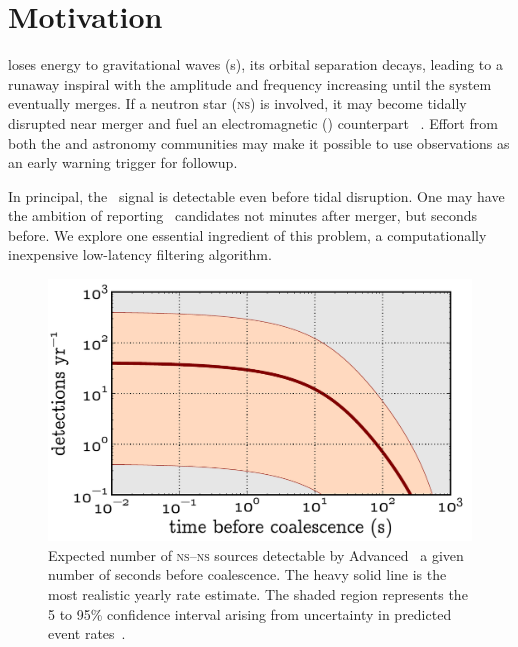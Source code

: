 \documentclass[portrait,plainboxedsections]{sciposter}
\begin{document}
\begin{minipage}[t]{0.25\textwidth}

\section*{Motivation}
 loses energy to gravitational waves (\GW{}s), its
orbital separation decays, leading to a runaway inspiral with the \GW{}
amplitude and frequency increasing until the system eventually merges.  If a
neutron star (\textsc{ns}) is involved, it may become tidally disrupted near
merger and fuel an electromagnetic (\EM{}) counterpart~%
\citep{shibata:2007}.  Effort from both the \GW{} and astronomy communities may make it
possible to use \GW{} observations as an early warning trigger for \EM{}
followup.

{\setlength{\parindent}{1em}
In principal, the \GW\ signal is detectable even before tidal
disruption. One may have the ambition of reporting \GW\ candidates not minutes
after merger, but seconds before.  We explore one essential ingredient of this
problem, a computationally inexpensive low-latency filtering algorithm.

}%
\begin{figure}[h]
\includegraphics[width=1.05\textwidth]{figures/snr_in_time}
\caption{\label{fig:earlywarning}Expected number of \textsc{ns}--\textsc{ns}
sources detectable by Advanced \LIGO\ a given number of seconds
before coalescence.  The heavy solid line is the most realistic yearly rate
estimate.  The shaded region represents the 5 to 95\% confidence interval
arising from uncertainty in predicted event rates~\citep{Abadie:2010p10836}.}
\end{figure}


\end{minipage}
\end{document}

